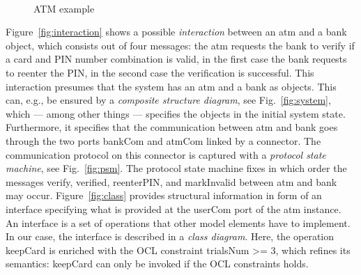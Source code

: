 \documentclass[10pt,fleqn,%
\ifpretendfinal
final%
\else
draft%
\fi,
]{scrreprt}
\newcommand{\uml}[1]{\textsf{#1}}
\begin{document}
\begin{figure}[!Ht]
{}
\hspace*{0.4cm}
\\
\vspace*{-1.5ex}
\caption{ATM example}\label{fig:atm-example}
\end{figure}

Figure~\ref{fig:interaction} shows a possible \emph{interaction}
between an \uml{atm} and a \uml{bank} object, which consists out of
four messages: the \uml{atm} requests the \uml{bank} to \uml{verify}
if a card and PIN number combination is valid, in the first case the
\uml{bank} requests to reenter the PIN, in the second case the
verification is successful.  This interaction presumes that the system
has an \uml{atm} and a \uml{bank} as objects. This can, e.g., be
ensured by a \emph{composite structure diagram}, see
Fig.~\ref{fig:system}, which --- among other things --- specifies the
objects in the initial system state.  Furthermore, it specifies that
the communication between \uml{atm} and \uml{bank} goes through the
two ports \uml{bankCom} and \uml{atmCom} linked by a connector.  The
communication protocol on this connector is captured with a
\emph{protocol state machine}, see Fig.~\ref{fig:psm}.  The protocol
state machine fixes in which order the messages \uml{verify},
\uml{verified}, \uml{reenterPIN}, and \uml{markInvalid} between
\uml{atm} and \uml{bank} may occur.  Figure~\ref{fig:class} provides
structural information in form of an interface specifying what is
provided at the \uml{userCom} port of the \uml{atm} instance. An
interface is a set of operations that other model elements have to
implement. In our case, the interface is described in a \emph{class
  diagram}. Here, the operation \uml{keepCard} is enriched with the
OCL constraint \uml{trialsNum >= 3}, which refines its semantics:
\uml{keepCard} can only be invoked if the OCL constraints holds.
\end{document}
